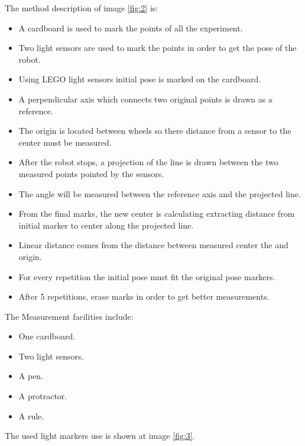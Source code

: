 \documentclass[10pt]{scrartcl}
\begin{document}
The method description of image \ref{fig:2} is:
\begin{itemize}
	\item A cardboard is used to mark the points of all the experiment.
	\item Two light sensors are used to mark the points in order to get the pose of the robot.
	\item Using LEGO light sensors initial pose is marked on the cardboard.
	\item A perpendicular axis which connects two original points is drawn as a reference.
	\item The origin is located between wheels so there distance from a sensor to the center must be measured. 
	\item After the robot stops, a projection of the line is drawn between the two measured points pointed by the sensors.
	\item The angle will be measured between the reference axis and the projected line.
	\item From the final marks, the new center is calculating extracting distance from initial marker to center along the projected line.
	\item Linear distance comes from the distance between measured center the and origin.
	\item For every repetition the initial pose must fit the original pose markers.	
	\item After 5 repetitions, erase marks in order to get better measurements.
\end{itemize}

The Measurement facilities include:

\begin{itemize}
	\item One cardboard.
	\item Two light sensors.
	\item A pen.
	\item A protractor.
	\item A rule.
\end{itemize}

The used light markers use is shown at image \ref{fig:3}.
\end{document}
